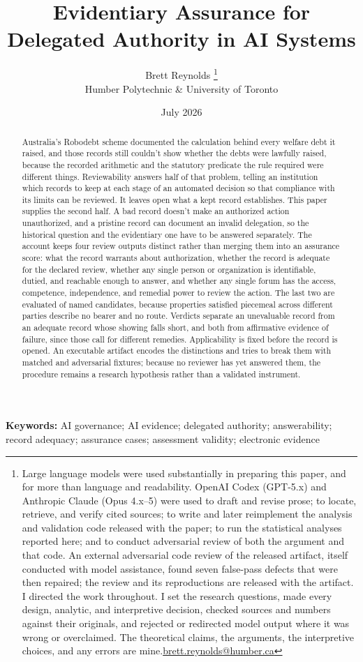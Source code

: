 \documentclass[12pt]{article}
\title{Evidentiary Assurance for\\Delegated Authority in AI Systems}
\author{Brett Reynolds \orcidlink{0000-0003-0073-7195}%
\thanks{Large language models were used substantially in preparing this paper, and for more than language and readability. OpenAI Codex (GPT-5.x) and Anthropic Claude (Opus 4.x--5) were used to draft and revise prose; to locate, retrieve, and verify cited sources; to write and later reimplement the analysis and validation code released with the paper; to run the statistical analyses reported here; and to conduct adversarial review of both the argument and that code. An external adversarial code review of the released artifact, itself conducted with model assistance, found seven false-pass defects that were then repaired; the review and its reproductions are released with the artifact. I directed the work throughout. I set the research questions, made every design, analytic, and interpretive decision, checked sources and numbers against their originals, and rejected or redirected model output where it was wrong or overclaimed. The theoretical claims, the arguments, the interpretive choices, and any errors are mine.\href{mailto:brett.reynolds@humber.ca}{brett.reynolds@humber.ca}}\\
Humber Polytechnic \& University of Toronto}
\date{July 2026}
\begin{document}
\maketitle

\begin{abstract}
Australia's Robodebt scheme documented the calculation behind every welfare debt it raised, and those records still couldn't show whether the debts were lawfully raised, because the recorded arithmetic and the statutory predicate the rule required were different things. Reviewability answers half of that problem, telling an institution which records to keep at each stage of an automated decision so that compliance with its limits can be reviewed. It leaves open what a kept record establishes. This paper supplies the second half. A bad record doesn't make an authorized action unauthorized, and a pristine record can document an invalid delegation, so the historical question and the evidentiary one have to be answered separately. The account keeps four review outputs distinct rather than merging them into an assurance score: what the record warrants about authorization, whether the record is adequate for the declared review, whether any single person or organization is identifiable, dutied, and reachable enough to answer, and whether any single forum has the access, competence, independence, and remedial power to review the action. The last two are evaluated of named candidates, because properties satisfied piecemeal across different parties describe no bearer and no route. Verdicts separate an unevaluable record from an adequate record whose showing falls short, and both from affirmative evidence of failure, since those call for different remedies. Applicability is fixed before the record is opened. An executable artifact encodes the distinctions and tries to break them with matched and adversarial fixtures; because no reviewer has yet answered them, the procedure remains a research hypothesis rather than a validated instrument.
\end{abstract}

\noindent\textbf{Keywords:} AI governance; AI evidence; delegated authority; answerability; record adequacy; assurance cases; assessment validity; electronic evidence







\clearpage

\clearpage


\clearpage
\begingroup
\renewcommand*{\bibfont}{\footnotesize}
\setlength{\bibitemsep}{0.25\baselineskip}
\printbibliography
\endgroup
\end{document}
